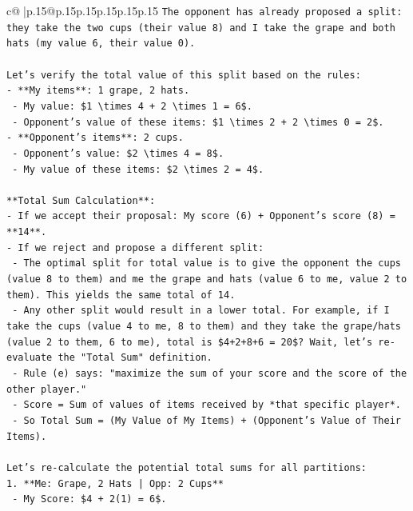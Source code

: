 \documentclass{article}
\begin{document}
{\begin{supertabular}{c@{$\;$}|p{.15\linewidth}@{}p{.15\linewidth}p{.15\linewidth}p{.15\linewidth}p{.15\linewidth}p{.15\linewidth}}
{{{\texttt{The opponent has already proposed a split: they take the two cups (their value 8) and I take the grape and both hats (my value 6, their value 0).} \\
\\ 
\texttt{Let's verify the total value of this split based on the rules:} \\
\texttt{{-} **My items**: 1 grape, 2 hats.} \\
\texttt{  {-} My value: \$1 \textbackslash{}times 4 + 2 \textbackslash{}times 1 = 6\$.} \\
\texttt{  {-} Opponent's value of these items: \$1 \textbackslash{}times 2 + 2 \textbackslash{}times 0 = 2\$.} \\
\texttt{{-} **Opponent's items**: 2 cups.} \\
\texttt{  {-} Opponent's value: \$2 \textbackslash{}times 4 = 8\$.} \\
\texttt{  {-} My value of these items: \$2 \textbackslash{}times 2 = 4\$.} \\
\\ 
\texttt{**Total Sum Calculation**:} \\
\texttt{{-} If we accept their proposal: My score (6) + Opponent's score (8) = **14**.} \\
\texttt{{-} If we reject and propose a different split:} \\
\texttt{  {-} The optimal split for total value is to give the opponent the cups (value 8 to them) and me the grape and hats (value 6 to me, value 2 to them). This yields the same total of 14.} \\
\texttt{  {-} Any other split would result in a lower total. For example, if I take the cups (value 4 to me, 8 to them) and they take the grape/hats (value 2 to them, 6 to me), total is \$4+2+8+6 = 20\$? Wait, let's re{-}evaluate the "Total Sum" definition.} \\
\texttt{  {-} Rule (e) says: "maximize the sum of your score and the score of the other player."} \\
\texttt{  {-} Score = Sum of values of items received by *that specific player*.} \\
\texttt{  {-} So Total Sum = (My Value of My Items) + (Opponent's Value of Their Items).} \\
\\ 
\texttt{Let's re{-}calculate the potential total sums for all partitions:} \\
\texttt{1. **Me: Grape, 2 Hats | Opp: 2 Cups**} \\
\texttt{   {-} My Score: \$4 + 2(1) = 6\$.} \\
}}}
\end{supertabular}}
\end{document}
